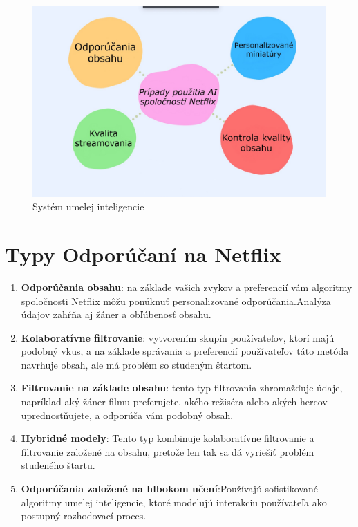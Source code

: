 \documentclass[10pt,slovak,a4paper]{article}
\begin{document}
\begin{figure}[H]
  \centering
  \includegraphics[width=1\textwidth]{Images_tables/AI.jpg}
  \caption{Systém umelej inteligencie}
\end{figure}


\section{Typy Odporúčaní na Netflix}

\begin{enumerate}
    \item \textbf{Odporúčania obsahu}: na základe vašich zvykov a preferencií vám algoritmy spoločnosti Netflix môžu ponúknuť personalizované odporúčania.Analýza údajov zahŕňa aj žáner a obľúbenosť obsahu.\cite{Odp:sys}
    
    \item \textbf{Kolaboratívne filtrovanie}: vytvorením skupín používateľov, ktorí majú podobný vkus, a na základe správania a preferencií používateľov táto metóda navrhuje obsah, ale má problém so studeným štartom\cite{Chladny:start}.
    
    \item \textbf{Filtrovanie na základe obsahu}: tento typ filtrovania zhromažďuje údaje, napríklad aký žáner filmu preferujete, akého režiséra alebo akých hercov uprednostňujete, a odporúča vám podobný obsah.
    
    \item \textbf{Hybridné modely}: Tento typ kombinuje kolaboratívne filtrovanie a filtrovanie založené na obsahu, pretože len tak sa dá vyriešiť problém studeného štartu.

    \item \textbf{Odporúčania založené na hlbokom učení}:Používajú sofistikované algoritmy umelej inteligencie, ktoré modelujú interakciu používateľa ako postupný rozhodovací proces.
\end{enumerate}    
\end{document}
